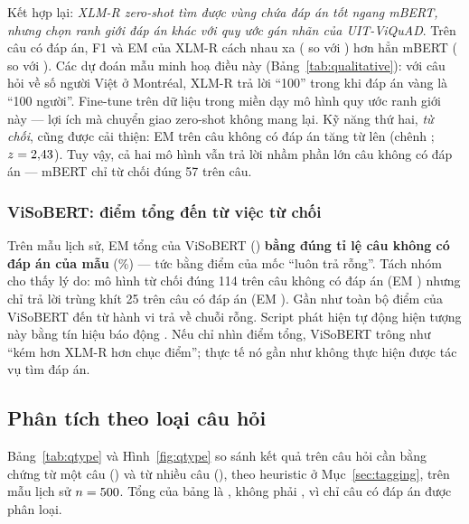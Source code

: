 Kết hợp lại: \emph{XLM-R zero-shot tìm được vùng chứa đáp án tốt ngang mBERT, nhưng chọn ranh
giới đáp án khác với quy ước gán nhãn của UIT-ViQuAD}. Trên câu có đáp án, F1 và EM của XLM-R cách
nhau xa (\histXlmrHasAnsFone{} so với \histXlmrHasAnsEM) hơn hẳn mBERT (\histMbertHasAnsFone{} so
với \histMbertHasAnsEM). Các dự đoán mẫu minh hoạ điều này (Bảng~\ref{tab:qualitative}): với câu
hỏi về số người Việt ở Montréal, XLM-R trả lời ``100'' trong khi đáp án vàng là ``100 người''.
Fine-tune trên dữ liệu trong miền dạy mô hình quy ước ranh giới này --- lợi ích mà chuyển giao
zero-shot không mang lại. Kỹ năng thứ hai, \emph{từ chối}, cũng được cải thiện: EM trên câu không
có đáp án tăng từ \histXlmrNoAnsEM{} lên \histMbertNoAnsEM{} (chênh \histMbertXlmrNoAnsDiffEM;
$z = 2{,}43$). Tuy vậy, cả hai mô hình vẫn trả lời nhầm phần lớn câu không có đáp
án --- mBERT chỉ từ chối đúng 57 trên \histNoAnsN{} câu.

\subsubsection{ViSoBERT: điểm tổng đến từ việc từ chối}

Trên mẫu lịch sử, EM tổng của ViSoBERT (\histVisoEM) \textbf{bằng đúng tỉ lệ câu không có đáp án
của mẫu} (\dataHistImpPct\%) --- tức bằng điểm của mốc ``luôn trả rỗng''. Tách nhóm cho thấy lý
do: mô hình từ chối đúng 114 trên \histNoAnsN{} câu không có đáp án (EM \histVisoNoAnsEM) nhưng chỉ
trả lời trùng khít 25 trên \histHasAnsN{} câu có đáp án (EM \histVisoHasAnsEM). Gần như toàn bộ
điểm của ViSoBERT đến từ hành vi trả về chuỗi rỗng. Script  phát hiện
tự động hiện tượng này bằng tín hiệu báo động . Nếu chỉ nhìn
điểm tổng, ViSoBERT trông như ``kém hơn XLM-R hơn chục điểm''; thực tế nó gần như không thực hiện
được tác vụ tìm đáp án.

\subsection{Phân tích theo loại câu hỏi}
\label{sec:by-qtype}

Bảng~\ref{tab:qtype} và Hình~\ref{fig:qtype} so sánh kết quả trên câu hỏi cần bằng chứng từ
một câu () và từ nhiều câu (), theo heuristic ở
Mục~\ref{sec:tagging}, trên mẫu lịch sử $n = 500$. Tổng của bảng là \histHasAnsN{}, không phải
\histN{}, vì chỉ câu có đáp án được phân loại.

